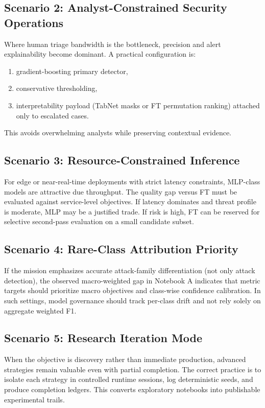 \documentclass[10pt,journal]{IEEEtran}
\begin{document}
\subsection{Scenario 2: Analyst-Constrained Security Operations}
Where human triage bandwidth is the bottleneck, precision and alert explainability become dominant. A practical configuration is:
\begin{enumerate}
\item gradient-boosting primary detector,
\item conservative thresholding,
\item interpretability payload (TabNet masks or FT permutation ranking) attached only to escalated cases.
\end{enumerate}
This avoids overwhelming analysts while preserving contextual evidence.

\subsection{Scenario 3: Resource-Constrained Inference}
For edge or near-real-time deployments with strict latency constraints, MLP-class models are attractive due throughput. The quality gap versus FT must be evaluated against service-level objectives. If latency dominates and threat profile is moderate, MLP may be a justified trade. If risk is high, FT can be reserved for selective second-pass evaluation on a small candidate subset.

\subsection{Scenario 4: Rare-Class Attribution Priority}
If the mission emphasizes accurate attack-family differentiation (not only attack detection), the observed macro-weighted gap in Notebook A indicates that metric targets should prioritize macro objectives and class-wise confidence calibration. In such settings, model governance should track per-class drift and not rely solely on aggregate weighted F1.

\subsection{Scenario 5: Research Iteration Mode}
When the objective is discovery rather than immediate production, advanced strategies remain valuable even with partial completion. The correct practice is to isolate each strategy in controlled runtime sessions, log deterministic seeds, and produce completion ledgers. This converts exploratory notebooks into publishable experimental trails.
\end{document}
